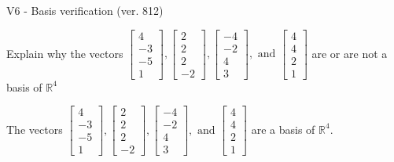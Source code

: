 \begin{exercise}
  \begin{exerciseTitle}V6 - Basis verification (ver. 812)\end{exerciseTitle}
  \begin{exerciseStatement}
    Explain why the vectors \(\left[\begin{array}{r}
4 \\
-3 \\
-5 \\
1
\end{array}\right] , \left[\begin{array}{r}
2 \\
2 \\
2 \\
-2
\end{array}\right] , \left[\begin{array}{r}
-4 \\
-2 \\
4 \\
3
\end{array}\right] , \text{ and } \left[\begin{array}{r}
4 \\
4 \\
2 \\
1
\end{array}\right]\) are or are not a basis of \(\mathbb{R}^4\)	


  \end{exerciseStatement}
  \begin{exerciseAnswer}
   The vectors \(\left[\begin{array}{r}
4 \\
-3 \\
-5 \\
1
\end{array}\right] , \left[\begin{array}{r}
2 \\
2 \\
2 \\
-2
\end{array}\right] , \left[\begin{array}{r}
-4 \\
-2 \\
4 \\
3
\end{array}\right] , \text{ and } \left[\begin{array}{r}
4 \\
4 \\
2 \\
1
\end{array}\right]\) 
  	 are  a basis of \(\mathbb{R}^4\).
  


  \end{exerciseAnswer}
\end{exercise}